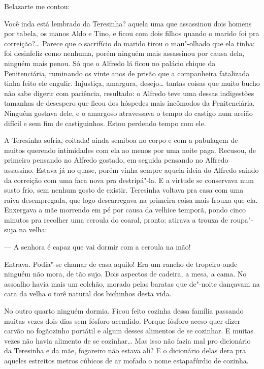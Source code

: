 \begin{linenumbers}
Belazarte me contou:

Você inda está lembrado da Teresinha? aquela uma que assassinou dois
homens por tabela, os manos Aldo e Tino, e ficou com dois filhos quando
o marido foi pra correição?\ldots{} Parece que o sacrifício do marido tirou o
mau"-olhado que ela tinha: foi desinfeliz como nenhuma, porém ninguém
mais assassinou por causa dela, ninguém mais penou. Só que o Alfredo lá
ficou no palácio chique da Penitenciária, ruminando os vinte anos de
prisão que a companheira fatalizada tinha feito ele engulir. Injustiça,
amargura, desejo\ldots{} tantas coisas que muito bucho não sabe digerir com
paciência, resultado: o Alfredo teve uma dessas indigestões tamanhas de
desespero que ficou dos hóspedes mais incômodos da Penitenciária.
Ninguém gostava dele, e o amargoso atravessava o tempo do castigo num
areião difícil e sem fim de castiguinhos. Estou perdendo tempo com ele.

A Teresinha sofria, coitada! ainda semiboa no corpo e com a pabulagem de
muitos querendo intimidades com ela ao menos por uma noite paga.
Recusou, de primeiro pensando no Alfredo gostado, em seguida pensando no
Alfredo assassino. Estava já no quase, porém vinha sempre aquela ideia
do Alfredo saindo da correição com uma faca nova pra destripá"-la. E a
virtude se conservava num susto frio, sem nenhum gosto de existir.
Teresinha voltava pra casa com uma raiva desempregada, que logo
descarregava na primeira coisa mais frouxa que ela. Enxergava a mãe
morrendo em pé por causa da velhice temporã, pondo cinco minutos pra
recolher uma ceroula do coaral, pronto: atirava a trouxa de roupa"-suja
na velha:

--- A senhora é capaz que vai dormir com a ceroula na mão!

Entrava. Podia"-se chamar de casa aquilo! Era um rancho de tropeiro onde
ninguém não mora, de tão sujo. Dois aspectos de cadeira, a mesa, a cama.
No assoalho havia mais um colchão, morado pelas baratas que de"-noite
dançavam na cara da velha o torê natural dos bichinhos desta vida.

No outro quarto ninguém dormia. Ficou feito cozinha dessa família
passando muitas vezes dois dias sem fósforo acendido. Porque fósforo
aceso quer dizer carvão no fogãozinho portátil e algum desses alimentos
de se cozinhar. E muitas vezes não havia alimento de se cozinhar\ldots{} Mas
isso não fazia mal pro dicionário da Teresinha e da mãe, fogareiro não
estava ali? E o dicionário delas dera pra aqueles estreitos metros
cúbicos de ar mofado o nome estapafúrdio de cozinha.


\end{linenumbers}
